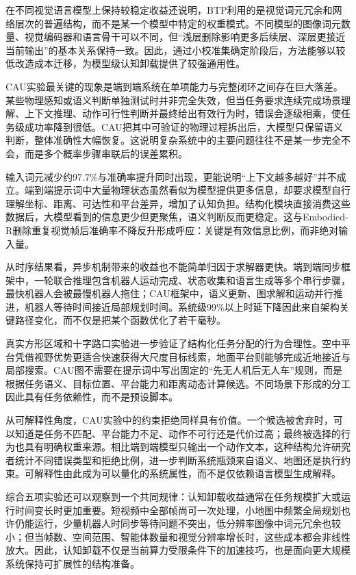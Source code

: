 在不同视觉语言模型上保持较稳定收益还说明，BTP利用的是视觉词元冗余和网络层次的普遍结构，而不是某一个模型中特定的权重模式。不同模型的图像词元数量、视觉编码器和语言骨干可以不同，但“浅层删除影响更多后续层、深层更接近当前输出”的基本关系保持一致。因此，通过小校准集确定阶段后，方法能够以较低改造成本迁移，为模型级认知卸载提供了较强通用性。

CAU实验最关键的现象是端到端系统在单项能力与完整闭环之间存在巨大落差。某些物理感知或语义判断单独测试时并非完全失效，但当任务要求连续完成场景理解、上下文推理、动作可行性判断并最终给出有效行为时，错误会逐级相乘，使任务级成功率降到很低。CAU把其中可验证的物理过程拆出后，大模型只保留语义判断，整体准确性大幅恢复。这说明复杂系统中的主要问题往往不是某一步完全不会，而是多个概率步骤串联后的误差累积。

输入词元减少约97.7\%与准确率提升同时出现，更能说明“上下文越多越好”并不成立。端到端提示词中大量物理状态虽然看似为模型提供更多信息，却要求模型自行理解坐标、距离、可达性和平台差异，增加了认知负担。结构化模块直接消费这些数据后，大模型看到的信息更少但更聚焦，语义判断反而更稳定。这与Embodied-R删除重复视觉帧后准确率不降反升形成呼应：关键是有效信息比例，而非绝对输入量。

从时序结果看，异步机制带来的收益也不能简单归因于求解器更快。端到端同步框架中，一轮联合推理包含机器人运动完成、状态收集和语言生成等多个串行步骤，最快机器人会被最慢机器人拖住；CAU框架中，语义更新、图求解和运动并行推进，机器人等待时间接近局部规划时间。系统级99\%以上时延下降因此来自架构关键路径变化，而不仅是把某个函数优化了若干毫秒。

真实方形区域和十字路口实验进一步验证了结构化任务分配的行为合理性。空中平台凭借视野优势更适合快速获得大尺度目标线索，地面平台则能够完成近地接近与局部搜索。CAU图不需要在提示词中写出固定的“先无人机后无人车”规则，而是根据任务语义、目标位置、平台能力和距离动态计算候选。不同场景下形成的分工因此具有任务依赖性，而不是预设脚本。

从可解释性角度，CAU实验中的约束拒绝同样具有价值。一个候选被舍弃时，可以知道是任务不匹配、平台能力不足、动作不可行还是代价过高；最终被选择的行为也具有明确权重来源。相比端到端模型只输出一个动作文本，这种结构允许研究者统计不同错误类型和拒绝比例，进一步判断系统瓶颈来自语义、地图还是执行约束。可解释性由此成为可以量化的系统属性，而不是仅依赖语言模型生成解释。

综合五项实验还可以观察到一个共同规律：认知卸载收益通常在任务规模扩大或运行时间变长时更加重要。短视频中全部帧尚可一次处理，小地图中频繁全局规划也许仍能运行，少量机器人时同步等待问题不突出，低分辨率图像中词元冗余也较小；但当帧数、空间范围、智能体数量和视觉分辨率增长时，这些成本都会非线性放大。因此，认知卸载不仅是当前算力受限条件下的加速技巧，也是面向更大规模系统保持可扩展性的结构准备。

